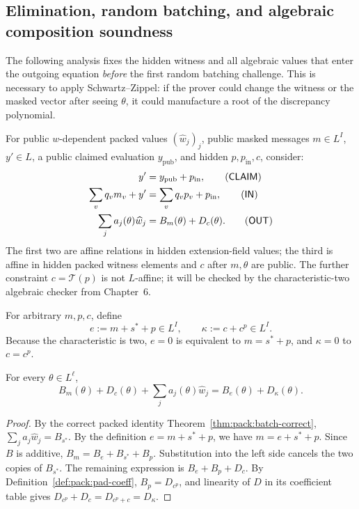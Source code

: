 \subsection{Elimination, random batching, and algebraic composition soundness}\label{sec:packing:soundness}

The following analysis fixes the hidden witness and
all algebraic values that enter the outgoing equation
\emph{before} the first random batching challenge.
This is necessary to apply Schwartz--Zippel:
if the prover could change the witness or the
masked vector after seeing $\theta$, it could
manufacture a root of the discrepancy polynomial.

\begin{definition}\label{def:pack:interfaces}
For public $w$-dependent packed values
$(\widehat w_j)_j$, public masked messages
$m\in L^I$, $y'\in L$, a public claimed
evaluation $y_{\mathrm{pub}}$, and hidden
$p,p_{\mathrm{in}},c$, consider:
\begin{align}
 y'&=y_{\mathrm{pub}}+p_{\mathrm{in}},
   \tag{$\mathsf{CLAIM}$}\label{eq:pack:claim}\\
 \sum_vq_vm_v+y'&=\sum_vq_vp_v+p_{\mathrm{in}},
   \tag{$\mathsf{IN}$}\label{eq:pack:in-new}\\
 \sum_ja_j(\theta)\widehat w_j
   &=B_m(\theta)+D_c(\theta).
   \tag{$\mathsf{OUT}$}\label{eq:pack:out-new}
\end{align}
The first two are affine relations in hidden
extension-field values; the third is affine
in hidden packed witness elements and $c$
after $m,\theta$ are public. The further
constraint $c=\mathcal T(p)$ is not
$L$-affine; it will be checked by the
characteristic-two algebraic checker from
Chapter~6.
\end{definition}

\begin{definition}\label{def:pack:errors}
For arbitrary $m,p,c$, define
\[
 e:=m+s^*+p\in L^I,\qquad
 \kappa:=c+c^p\in L^I.
\]
Because the characteristic is two,
$e=0$ is equivalent to $m=s^*+p$,
and $\kappa=0$ to $c=c^p$.
\end{definition}

\begin{lemma}\label{lem:pack:out-error}
For every $\theta\in L^\ell$,
\[
 \boxed{
 B_m(\theta)+D_c(\theta)
   +\sum_ja_j(\theta)\widehat w_j
 = B_e(\theta)+D_\kappa(\theta).
 }
\]
\end{lemma}
\begin{proof}
By the correct packed identity
Theorem~\ref{thm:pack:batch-correct},
$\sum_ja_j\widehat w_j=B_{s^*}$.
By the definition $e=m+s^*+p$,
we have $m=e+s^*+p$. Since $B$
is additive,
$B_m=B_e+B_{s^*}+B_p$.
Substitution into the left side cancels
the two copies of $B_{s^*}$.
The remaining expression is
$B_e+B_p+D_c$.
By Definition~\ref{def:pack:pad-coeff},
$B_p=D_{c^p}$, and linearity of
$D$ in its coefficient table gives
$D_{c^p}+D_c=D_{c^p+c}=D_\kappa$.
\end{proof}

